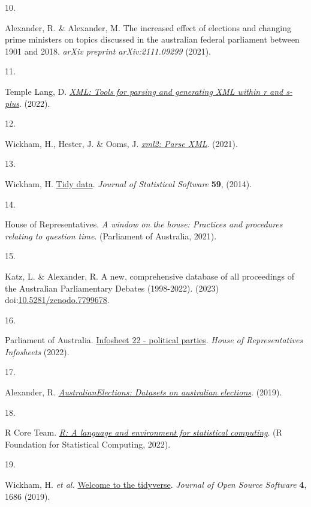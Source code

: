 \documentclass[
  letterpaper,
  DIV=11,
  numbers=noendperiod]{scrartcl}
\newlength{\cslhangindent}
\newlength{\csllabelwidth}
\newlength{\cslentryspacingunit} %
\newenvironment{CSLReferences}[2] %
 {%
  \setlength{\parindent}{0pt}
  \ifodd #1
  \let\oldpar\par
  \def\par{\hangindent=\cslhangindent\oldpar}
  \fi
  \setlength{\parskip}{#2\cslentryspacingunit}
 }%
 {}
\newcommand{\CSLLeftMargin}[1]{\parbox[t]{\csllabelwidth}{#1}}
\newcommand{\CSLRightInline}[1]{\parbox[t]{\linewidth - \csllabelwidth}{#1}\break}
\begin{document}
\begin{CSLReferences}{0}{0}
\leavevmode{}%
\CSLLeftMargin{10. }%
\CSLRightInline{Alexander, R. \& Alexander, M. The increased effect of
elections and changing prime ministers on topics discussed in the
australian federal parliament between 1901 and 2018. \emph{arXiv
preprint arXiv:2111.09299} (2021).}

\leavevmode{}%
\CSLLeftMargin{11. }%
\CSLRightInline{Temple Lang, D.
\emph{\href{https://CRAN.R-project.org/package=XML}{XML: Tools for
parsing and generating XML within r and s-plus}}. (2022).}

\leavevmode{}%
\CSLLeftMargin{12. }%
\CSLRightInline{Wickham, H., Hester, J. \& Ooms, J.
\emph{\href{https://CRAN.R-project.org/package=xml2}{xml2: Parse XML}}.
(2021).}

\leavevmode{}%
\CSLLeftMargin{13. }%
\CSLRightInline{Wickham, H.
\href{https://doi.org/10.18637/jss.v059.i10}{Tidy data}. \emph{Journal
of Statistical Software} \textbf{59}, (2014).}

\leavevmode{}%
\CSLLeftMargin{14. }%
\CSLRightInline{House of Representatives. \emph{{A window on the house:
Practices and procedures relating to question time}}. ({Parliament of
Australia}, 2021).}

\leavevmode{}%
\CSLLeftMargin{15. }%
\CSLRightInline{Katz, L. \& Alexander, R. {A new, comprehensive database
of all proceedings of the Australian Parliamentary Debates (1998-2022)}.
(2023)
doi:\href{https://doi.org/10.5281/zenodo.7799678}{10.5281/zenodo.7799678}.}

\leavevmode{}%
\CSLLeftMargin{16. }%
\CSLRightInline{Parliament of Australia.
\href{https://www.aph.gov.au/About_Parliament/House_of_Representatives/Powers_practice_and_procedure/00_-_Infosheets/Infosheet_22_-_Political_parties}{Infosheet
22 - political parties}. \emph{House of Representatives Infosheets}
(2022).}

\leavevmode{}%
\CSLLeftMargin{17. }%
\CSLRightInline{Alexander, R.
\emph{\href{https://github.com/RohanAlexander/AustralianElections}{AustralianElections:
Datasets on australian elections}}. (2019).}

\leavevmode{}%
\CSLLeftMargin{18. }%
\CSLRightInline{R Core Team. \emph{\href{https://www.R-project.org/}{R:
A language and environment for statistical computing}}. (R Foundation
for Statistical Computing, 2022).}

\leavevmode{}%
\CSLLeftMargin{19. }%
\CSLRightInline{Wickham, H. \emph{et al.}
\href{https://doi.org/10.21105/joss.01686}{Welcome to the {tidyverse}}.
\emph{Journal of Open Source Software} \textbf{4}, 1686 (2019).}

\end{CSLReferences}
\end{document}
